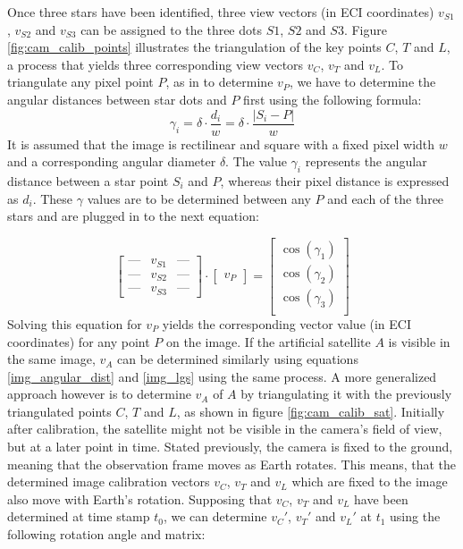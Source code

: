 \documentclass[11pt,a4paper]{article}
\begin{document}
	Once three stars have been identified, three view vectors (in ECI coordinates) $v_{S1}$, $v_{S2}$ and $v_{S3}$ can be assigned to the three dots $S1$, $S2$ and $S3$.\newline
	Figure \ref{fig:cam_calib_points} illustrates the triangulation of the key points $C$, $T$ and $L$, a process that yields three corresponding view vectors $v_C$, $v_T$ and $v_L$. To triangulate any pixel point $P$, as in to determine $v_P$, we have to determine the angular distances between star dots and $P$ first using the following formula:
	\begin{equation}
		\label{img_angular_dist}
		\gamma_i = \delta \cdot \frac{d_i}{w}= \delta \cdot \frac{|S_i-P|}{w}
	\end{equation}
	It is assumed that the image is rectilinear and square with a fixed pixel width $w$ and a corresponding angular diameter $\delta$. The value $\gamma_{i}$ represents the angular distance between a star point $S_i$ and $P$, whereas their pixel distance is expressed as $d_i$. These $\gamma$ values are to be determined between any $P$ and each of the three stars and are plugged in to the next equation:
	
	\begin{equation}
		\label{img_lgs}
		\begin{bmatrix}
			\text{---} & v_{S1} & \text{---} \\
			\text{---} & v_{S2} & \text{---} \\
			\text{---} & v_{S3} & \text{---}
		\end{bmatrix}\cdot
		\begin{bmatrix}
			v_P
		\end{bmatrix}=
		\begin{bmatrix}
			\cos(\gamma_{1}) \\
			\cos(\gamma_{2}) \\
			\cos(\gamma_{3}) \\
		\end{bmatrix}
	\end{equation}
	Solving this equation for $v_P$ yields the corresponding vector value (in ECI coordinates) for any point $P$ on the image. \cite{self_localization_in_space}\newline
	If the artificial satellite $A$ is visible in the same image, $v_A$ can be determined similarly using equations \ref{img_angular_dist} and \ref{img_lgs} using the same process. A more generalized approach however is to determine $v_A$ of $A$ by triangulating it with the previously triangulated points $C$, $T$ and $L$, as shown in figure \ref{fig:cam_calib_sat}. Initially after calibration, the satellite might not be visible in the camera's field of view, but at a later point in time. Stated previously, the camera is fixed to the ground, meaning that the observation frame moves as Earth rotates. This means, that the determined image calibration vectors $v_C$, $v_T$ and $v_L$ which are fixed to the image also move with Earth's rotation. Supposing that $v_C$, $v_T$ and $v_L$ have been determined at time stamp $t_0$, we can determine $v_C'$, $v_T'$ and $v_L'$ at $t_1$ using the following rotation angle and matrix:
	
\end{document}
